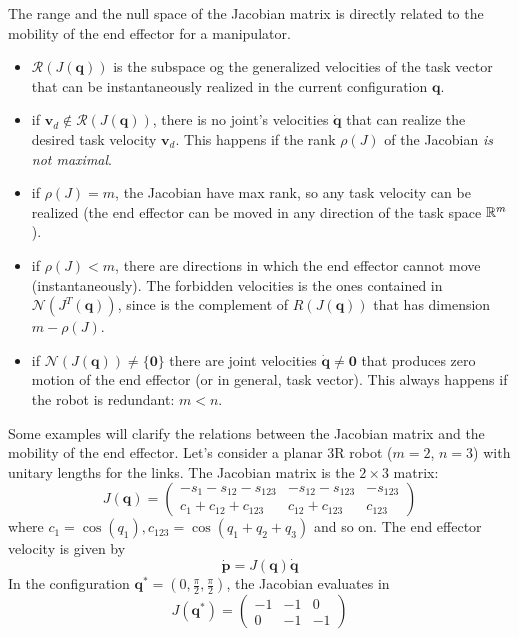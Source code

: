 \documentclass[10pt, letterpaper]{report}
\begin{document}
The range and the null space of the Jacobian matrix is directly related to the mobility of the end effector for a manipulator.\begin{itemize}
   \item $\mathcal R(J(\mathbf q))$ is the subspace og the generalized velocities of the task vector that can be instantaneously realized in the current configuration $\mathbf q$. 
   \item if $\mathbf v_d\notin \mathcal R(J(\mathbf q))$, there is no joint's velocities $\dot{\mathbf q}$ that can realize the desired task velocity $\mathbf v_d$. This happens if the rank $\rho(J)$ of the Jacobian \textit{is not maximal}.
   \item if $\rho(J)=m$, the Jacobian have max rank, so any task velocity can be realized (the end effector can be moved in any direction of the task space ${\mathbb R}^m$).
   \item if $\rho(J)<m$, there are directions in which the end effector cannot move (instantaneously). The forbidden velocities is the ones contained in $\mathcal N(J^T(\mathbf q))$, since is the complement of $R(J(\mathbf q))$ that has dimension $m-\rho(J)$.
   \item if $\mathcal N(J(\mathbf q))\ne \{\mathbf 0\}$ there are joint velocities $\dot{\mathbf q}\ne \mathbf 0$ that produces zero motion of the end effector (or in general, task vector). This always happens if the robot is redundant: $m<n$.
\end{itemize}
Some examples will clarify the relations between the Jacobian matrix and the mobility of the end effector. Let's consider a planar 3R robot ($m=2$, $n=3$) with unitary lengths for the links. The Jacobian matrix is the $2\times 3$ matrix:\begin{equation}
    J(\mathbf q) = \begin{pmatrix}
        -s_1-s_{12}-s_{123}&-s_{12}-s_{123}&-s_{123}\\ 
        c_1+c_{12}+c_{123}&c_{12}+c_{123}&c_{123}
    \end{pmatrix}
\end{equation}
where $c_{1}=\cos(q_1), c_{123}=\cos(q_1+q_2+q_3)$ and so on. The end effector velocity is given by\begin{equation}
    \dot{\mathbf p}=J(\mathbf q)\dot{\mathbf q}
\end{equation}
In the configuration $\mathbf q^*=(0,\frac{\pi}{2},\frac{\pi}{2})$, the Jacobian evaluates in \begin{equation}
    J(\mathbf q^*)=\begin{pmatrix}
        -1&-1&0\\ 
        0&-1&-1
    \end{pmatrix}
\end{equation}
\end{document}
